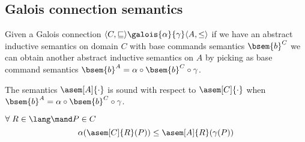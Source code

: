 \subsection{Galois connection semantics}
  Given a Galois connection $\langle C, \sqsubseteq \rangle
  \galois{\alpha}{\gamma} \langle A, \leq \rangle$ if we have an abstract 
  inductive semantics on domain $C$ with base commands semantics $\bsem{b}^C$
  we can obtain another abstract inductive semantics on $A$ by picking as
  base command semantics $\bsem{b}^A = \alpha \circ \bsem{b}^C \circ \gamma$.



  \begin{theorem}[Soundness]

    The semantics $\asem[A]{\cdot}$ is sound with respect to $\asem[C]{\cdot}$
    when $\bsem{b}^A = \alpha \circ \bsem{b}^C \circ \gamma$.

    $\forall \; R \in \lang \mand P \in C$
    $$\alpha(\asem[C]{R}(P)) \leq \asem[A]{R}(\gamma(P))$$
  \end{theorem}
  
